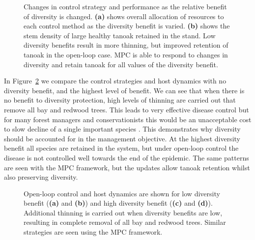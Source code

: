 \begin{figure}[t]
    \begin{center}
        \caption[Varying the diversity benefits]{Changes in control strategy and performance as the relative benefit of diversity is changed. \textbf{(a)} shows overall allocation of resources to each control method as the diversity benefit is varied. \textbf{(b)} shows the stem density of large healthy tanoak retained in the stand. Low diversity benefits result in more thinning, but improved retention of tanoak in the open-loop case. MPC is able to respond to changes in diversity and retain tanoak for all values of the diversity benefit.\label{fig:ch6:div_scan}}
    \end{center}
\end{figure}

In Figure~\ref{fig:ch6:div_compare} we compare the control strategies and host dynamics with no diversity benefit, and the highest level of benefit. We can see that when there is no benefit to diversity protection, high levels of thinning are carried out that remove all bay and redwood trees. This leads to very effective disease control but for many forest managers and conservationists this would be an unacceptable cost to slow decline of a single important species \cite{noss_redwood_2000}. This demonstrates why diversity should be accounted for in the management objective. At the highest diversity benefit all species are retained in the system, but under open-loop control the disease is not controlled well towards the end of the epidemic. The same patterns are seen with the MPC framework, but the updates allow tanoak retention whilst also preserving diversity.

\begin{figure}[H]
    \begin{center}
        \caption[Host dynamics when varying the diversity benefits]{Open-loop control and host dynamics are shown for low diversity benefit (\textbf{(a)} and \textbf{(b)}) and high diversity benefit (\textbf{(c)} and \textbf{(d)}). Additional thinning is carried out when diversity benefits are low, resulting in complete removal of all bay and redwood trees. Similar strategies are seen using the MPC framework.\label{fig:ch6:div_compare}}
    \end{center}
\end{figure}

